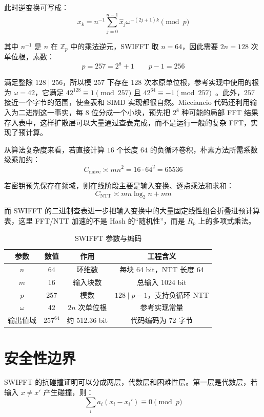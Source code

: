 \documentclass{article}
\begin{document}
此时逆变换可写成：
\[ x_k=n^{-1}\sum_{j=0}^{n-1}\widehat{x}_j\omega^{-(2j+1)k}\pmod p \]

其中 $n^{-1}$ 是 $n$ 在 $\mathbb{Z}_p$ 中的乘法逆元，SWIFFT 取 $n=64$，因此需要 $2n=128$ 次单位根，素数：
\[ p=257=2^8+1\qquad p-1=256 \]

满足整除 $128\mid 256$，所以模 257 下存在 128 次本原单位根，参考实现中使用的根为 $\omega=42$，它满足 $42^{128}\equiv1\pmod{257}$ 且 $42^{64}\equiv-1\pmod{257}$~\cite{Repo}。此外，$257$ 接近一个字节的范围，使查表和 SIMD 实现都很自然。Micciancio 代码还利用输入为二进制这一事实，每 8 位分成一个小块，预先把 $2^8$ 种可能的局部 FFT 结果存入表中，这样扩散层可以大量通过查表完成，而不是运行一般的复杂 FFT，实现了预计算。

从算法复杂度来看，若直接计算 $16$ 个长度 $64$ 的负循环卷积，朴素方法所需系数级乘加约：
\[ C_{\text{naive}}\asymp m n^2=16\cdot64^2=65536 \]

若密钥预先保存在频域，则在线阶段主要是输入变换、逐点乘法和求和：
\[ C_{\text{NTT}}\asymp m n\log_2n+mn \]

而 SWIFFT 的二进制查表进一步把输入变换中的大量固定线性组合折叠进预计算表，这里 FFT/NTT 加速的不是 Hash 的“随机性”，而是 $R_p$ 上的多项式乘法。

\begin{table}[H]
    \centering
    \renewcommand{\arraystretch}{1.5}
    \setlength{\tabcolsep}{16pt}
    \caption{SWIFFT 参数与编码}
    \begin{tabular}{cccc}
        \toprule[1.5pt]
        参数 & 数值 & 作用 & 工程含义 \\
        \midrule[0.75pt]
        $n$ & 64 & 环维数 & 每块 64 bit，NTT 长度 64 \\
        $m$ & 16 & 输入块数 & 总输入 1024 bit \\
        $p$ & 257 & 模数 & $128\mid p-1$，支持负循环 NTT \\
        $\omega$ & 42 & $2n$ 次单位根 & 参考实现常量 \\
        输出值域 & $257^{64}$ & 约 512.36 bit & 代码编码为 72 字节 \\
        \bottomrule[1.5pt]
    \end{tabular}
\end{table}



\section{安全性边界}
SWIFFT 的抗碰撞证明可以分成两层，代数层和困难性层。第一层是代数层，若输入 $x\neq x'$ 产生碰撞，则：
\[ \sum_{i}a_i(x_i-x_i')\equiv0\pmod p \]
\end{document}

